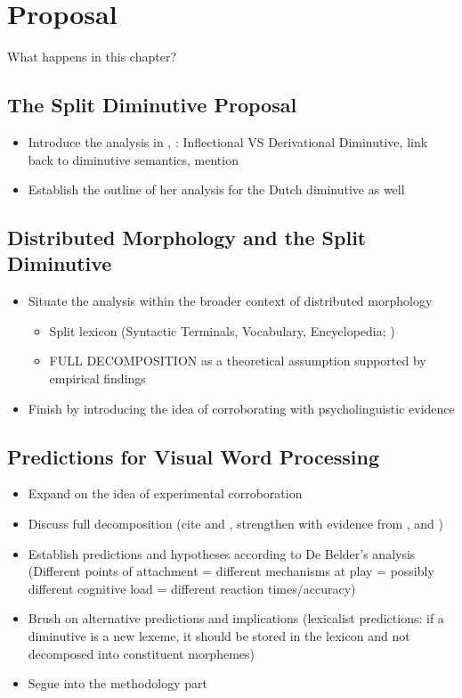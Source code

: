 \chapter{Proposal}\label{chp:proposal}

What happens in this chapter? \par

\section{The Split Diminutive Proposal}
\label{sec:3-split-dim}
\begin{itemize}
    \item Introduce the analysis in \cite{DeBelder+etal+2014}, \cite{DeBelder+2011a}: Inflectional VS Derivational Diminutive, link back to diminutive semantics, mention \cite{Wiltschko+2006}
    \item Establish the outline of her analysis for the Dutch diminutive as well
\end{itemize}
\section{Distributed Morphology and the Split Diminutive}
\begin{itemize}
    \item Situate the analysis within the broader context of distributed morphology
    \begin{itemize}
        \item Split lexicon (Syntactic Terminals, Vocabulary, Encyclopedia; \cite{Embick+2015})
        \item FULL DECOMPOSITION as a theoretical assumption supported by empirical findings
    \end{itemize}
    \item Finish by introducing the idea of corroborating with psycholinguistic evidence
\end{itemize}
\section{Predictions for Visual Word Processing}
\begin{itemize}
    \item Expand on the idea of experimental corroboration
    \item Discuss full decomposition (cite \cite{Taft+1979} and \cite{Taft+2004}, strengthen with evidence from \cite{Fruchter+Marantz+2015}, \cite{Stockall+Marantz2006} and \cite{Fruchter+etal+2013})
    \item Establish predictions and hypotheses according to De Belder's analysis (Different points of attachment = different mechanisms at play = possibly different cognitive load = different reaction times/accuracy)
    \item Brush on alternative predictions and implications (lexicalist predictions: if a diminutive is a new lexeme, it should be stored in the lexicon and not decomposed into constituent morphemes)
    \item Segue into the methodology part
\end{itemize}

